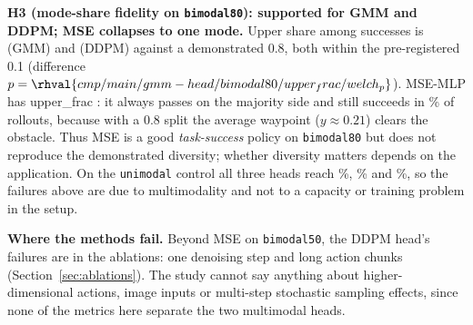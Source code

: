\textbf{H3 (mode-share fidelity on \texttt{bimodal80}): supported for GMM and DDPM; MSE collapses to one mode.} Upper share among successes is  (GMM) and  (DDPM) against a demonstrated 0.8, both within the pre-registered 0.1 (difference $p=\rhval{cmp/main/gmm-head/bimodal80/upper_frac/welch_p}$). MSE-MLP has upper\_frac : it always passes on the majority side and still succeeds in \% of rollouts, because with a 0.8 split the average waypoint ($y\approx0.21$) clears the obstacle. Thus MSE is a good \emph{task-success} policy on \texttt{bimodal80} but does not reproduce the demonstrated diversity; whether diversity matters depends on the application. On the \texttt{unimodal} control all three heads reach \%, \% and \%, so the failures above are due to multimodality and not to a capacity or training problem in the setup.

\textbf{Where the methods fail.} Beyond MSE on \texttt{bimodal50}, the DDPM head's failures are in the ablations: one denoising step and long action chunks (Section~\ref{sec:ablations}). The study cannot say anything about higher-dimensional actions, image inputs or multi-step stochastic sampling effects, since none of the metrics here separate the two multimodal heads.
